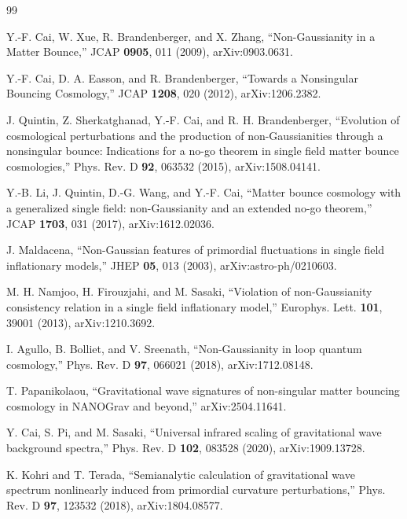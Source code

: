 \documentclass[aps,prd,twocolumn,superscriptaddress,nofootinbib,longbibliography]{revtex4-2}
\begin{document}
\begin{thebibliography}{99}

 Y.-F. Cai, W. Xue, R. Brandenberger, and X. Zhang,
  ``Non-Gaussianity in a Matter Bounce,'' JCAP \textbf{0905}, 011 (2009),
  arXiv:0903.0631.

 Y.-F. Cai, D. A. Easson, and R. Brandenberger,
  ``Towards a Nonsingular Bouncing Cosmology,'' JCAP \textbf{1208}, 020 (2012),
  arXiv:1206.2382.

 J. Quintin, Z. Sherkatghanad, Y.-F. Cai, and
  R. H. Brandenberger, ``Evolution of cosmological perturbations and the
  production of non-Gaussianities through a nonsingular bounce: Indications for a no-go theorem in single field matter bounce cosmologies,''
  Phys. Rev. D \textbf{92}, 063532 (2015), arXiv:1508.04141.

 Y.-B. Li, J. Quintin, D.-G. Wang, and Y.-F. Cai,
  ``Matter bounce cosmology with a generalized single field: non-Gaussianity and
  an extended no-go theorem,'' JCAP \textbf{1703}, 031 (2017),
  arXiv:1612.02036.

 J. Maldacena,
  ``Non-Gaussian features of primordial fluctuations in single field
  inflationary models,'' JHEP \textbf{05}, 013 (2003), arXiv:astro-ph/0210603.

 M. H. Namjoo, H. Firouzjahi, and M. Sasaki,
  ``Violation of non-Gaussianity consistency relation in a single field
  inflationary model,'' Europhys. Lett. \textbf{101}, 39001 (2013),
  arXiv:1210.3692.

 I. Agullo, B. Bolliet, and V. Sreenath,
  ``Non-Gaussianity in loop quantum cosmology,'' Phys. Rev. D \textbf{97},
  066021 (2018), arXiv:1712.08148.

 T. Papanikolaou,
  ``Gravitational wave signatures of non-singular matter bouncing cosmology in
  NANOGrav and beyond,'' arXiv:2504.11641.

 Y. Cai, S. Pi, and M. Sasaki,
  ``Universal infrared scaling of gravitational wave background spectra,''
  Phys. Rev. D \textbf{102}, 083528 (2020), arXiv:1909.13728.

 K. Kohri and T. Terada,
  ``Semianalytic calculation of gravitational wave spectrum nonlinearly
  induced from primordial curvature perturbations,''
  Phys. Rev. D \textbf{97}, 123532 (2018), arXiv:1804.08577.


\end{thebibliography}
\end{document}

